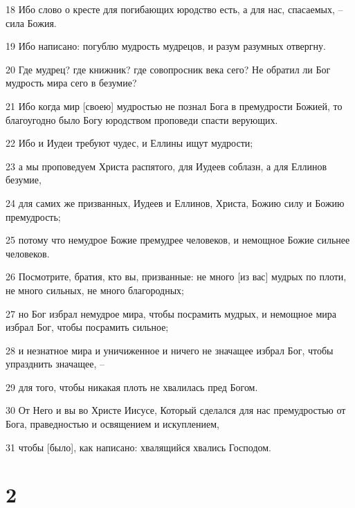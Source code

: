 \par 18 Ибо слово о кресте для погибающих юродство есть, а для нас, спасаемых, --сила Божия.
\par 19 Ибо написано: погублю мудрость мудрецов, и разум разумных отвергну.
\par 20 Где мудрец? где книжник? где совопросник века сего? Не обратил ли Бог мудрость мира сего в безумие?
\par 21 Ибо когда мир [своею] мудростью не познал Бога в премудрости Божией, то благоугодно было Богу юродством проповеди спасти верующих.
\par 22 Ибо и Иудеи требуют чудес, и Еллины ищут мудрости;
\par 23 а мы проповедуем Христа распятого, для Иудеев соблазн, а для Еллинов безумие,
\par 24 для самих же призванных, Иудеев и Еллинов, Христа, Божию силу и Божию премудрость;
\par 25 потому что немудрое Божие премудрее человеков, и немощное Божие сильнее человеков.
\par 26 Посмотрите, братия, кто вы, призванные: не много [из вас] мудрых по плоти, не много сильных, не много благородных;
\par 27 но Бог избрал немудрое мира, чтобы посрамить мудрых, и немощное мира избрал Бог, чтобы посрамить сильное;
\par 28 и незнатное мира и уничиженное и ничего не значащее избрал Бог, чтобы упразднить значащее, --
\par 29 для того, чтобы никакая плоть не хвалилась пред Богом.
\par 30 От Него и вы во Христе Иисусе, Который сделался для нас премудростью от Бога, праведностью и освящением и искуплением,
\par 31 чтобы [было], как написано: хвалящийся хвались Господом.

\chapter{2}

